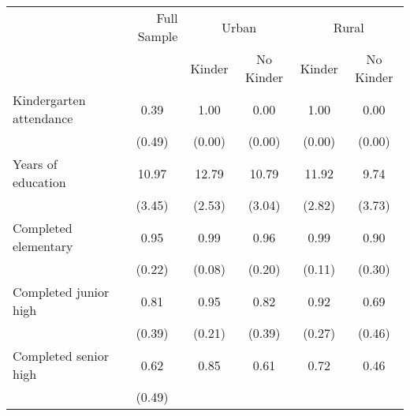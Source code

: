 \begin{tabular}{llllll}
\cline{1-6}
\multicolumn{1}{c}{} &
  \multicolumn{1}{r}{Full Sample} &
  \multicolumn{2}{c}{Urban} &
  \multicolumn{2}{c}{Rural} \\ \cmidrule(lr){2-2} \cmidrule(lr){3-4} \cmidrule(lr){5-6}
\multicolumn{1}{c}{} &
  \multicolumn{1}{r}{} &
  \multicolumn{1}{c}{Kinder} &
  \multicolumn{1}{c}{No Kinder} &
  \multicolumn{1}{c}{Kinder} &
  \multicolumn{1}{c}{No Kinder} \\
\cline{1-6}
\multicolumn{1}{l}{Kindergarten attendance} &
  \multicolumn{1}{c}{0.39} &
  \multicolumn{1}{c}{1.00} &
  \multicolumn{1}{c}{0.00} &
  \multicolumn{1}{c}{1.00} &
  \multicolumn{1}{c}{0.00} \\
\multicolumn{1}{l}{} &
  \multicolumn{1}{c}{(0.49)} &
  \multicolumn{1}{c}{(0.00)} &
  \multicolumn{1}{c}{(0.00)} &
  \multicolumn{1}{c}{(0.00)} &
  \multicolumn{1}{c}{(0.00)} \\
\multicolumn{1}{l}{Years of education} &
  \multicolumn{1}{c}{10.97} &
  \multicolumn{1}{c}{12.79} &
  \multicolumn{1}{c}{10.79} &
  \multicolumn{1}{c}{11.92} &
  \multicolumn{1}{c}{9.74} \\
\multicolumn{1}{l}{} &
  \multicolumn{1}{c}{(3.45)} &
  \multicolumn{1}{c}{(2.53)} &
  \multicolumn{1}{c}{(3.04)} &
  \multicolumn{1}{c}{(2.82)} &
  \multicolumn{1}{c}{(3.73)} \\
\multicolumn{1}{l}{Completed elementary} &
  \multicolumn{1}{c}{0.95} &
  \multicolumn{1}{c}{0.99} &
  \multicolumn{1}{c}{0.96} &
  \multicolumn{1}{c}{0.99} &
  \multicolumn{1}{c}{0.90} \\
\multicolumn{1}{l}{} &
  \multicolumn{1}{c}{(0.22)} &
  \multicolumn{1}{c}{(0.08)} &
  \multicolumn{1}{c}{(0.20)} &
  \multicolumn{1}{c}{(0.11)} &
  \multicolumn{1}{c}{(0.30)} \\
\multicolumn{1}{l}{Completed junior high} &
  \multicolumn{1}{c}{0.81} &
  \multicolumn{1}{c}{0.95} &
  \multicolumn{1}{c}{0.82} &
  \multicolumn{1}{c}{0.92} &
  \multicolumn{1}{c}{0.69} \\
\multicolumn{1}{l}{} &
  \multicolumn{1}{c}{(0.39)} &
  \multicolumn{1}{c}{(0.21)} &
  \multicolumn{1}{c}{(0.39)} &
  \multicolumn{1}{c}{(0.27)} &
  \multicolumn{1}{c}{(0.46)} \\
\multicolumn{1}{l}{Completed senior high} &
  \multicolumn{1}{c}{0.62} &
  \multicolumn{1}{c}{0.85} &
  \multicolumn{1}{c}{0.61} &
  \multicolumn{1}{c}{0.72} &
  \multicolumn{1}{c}{0.46} \\
\multicolumn{1}{l}{} &
  \multicolumn{1}{c}{(0.49)} &

\end{tabular}

